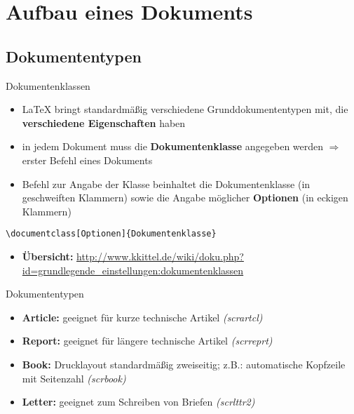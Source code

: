 \section{Aufbau eines Dokuments}

\subsection{Dokumententypen}
\begin{frame}[fragile]{Dokumentenklassen}
\begin{itemize}
\item \LaTeX{} bringt standardmä{\ss}ig verschiedene Grunddokumententypen mit, die \textbf{verschiedene Eigenschaften} haben \newline
\item in jedem Dokument muss die \textbf{Dokumentenklasse} angegeben werden $\Rightarrow$ erster Befehl eines Dokuments \newline
\item Befehl zur Angabe der Klasse beinhaltet die Dokumentenklasse (in geschweiften Klammern) sowie die Angabe möglicher \textbf{Optionen} (in eckigen Klammern)
\end{itemize}
\begin{lstlisting}[style=tex]
\documentclass[Optionen]{Dokumentenklasse}\end{lstlisting}
\begin{itemize}
\item \textbf{Übersicht:} \url{http://www.kkittel.de/wiki/doku.php?id=grundlegende_einstellungen:dokumentenklassen}
\end{itemize}
\end{frame}


\begin{frame}{Dokumententypen}
\begin{itemize}
\item \textbf{Article:} geeignet für kurze technische Artikel \textit{(scrartcl)}
\item \textbf{Report:} geeignet für längere technische Artikel \textit{(scrreprt)}
\item \textbf{Book:} Drucklayout standardmäßig zweiseitig; z.B.: automatische Kopfzeile mit Seitenzahl \textit{(scrbook)}

\item \textbf{Letter:} geeignet zum Schreiben von Briefen \textit{(scrlttr2)}
\end{itemize}
\end{frame}

